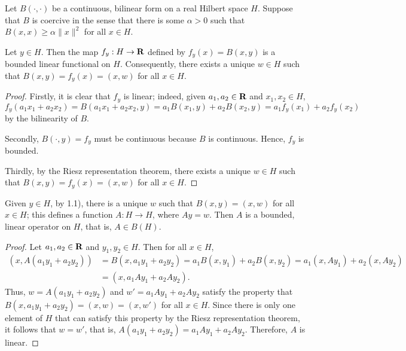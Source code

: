 \documentclass{homework}
\begin{document}
	\maketitle
	
	\question
	Let $B(\cdot,\cdot)$ be a continuous, bilinear form on a real Hilbert space $H$. Suppose that $B$ is coercive in the sense that there is some $\alpha > 0$ such that $B(x,x) \ge \alpha\lVert x\rVert^2$ for all $x \in H$.
	\begin{arabicparts}
		\questionpart 
		Let $y \in H$. Then the map $f_y : H \to \textbf{R}$ defined by $f_y(x) = B(x,y)$ is a bounded linear functional on $H$. Consequently, there exists a unique $w \in H$ such that $B(x,y) = f_y(x) = (x,w)$ for all $x \in H$.
		\begin{proof}
			Firstly, it is clear that $f_y$ is linear; indeed, given $a_1, a_2 \in \textbf{R}$ and $x_1, x_2 \in H$,
			\begin{equation}
				f_y(a_1x_1+a_2x_2) = B(a_1x_1+a_2x_2,y) = a_1B(x_1,y) + a_2B(x_2,y) = a_1f_y(x_1) + a_2f_y(x_2)
			\end{equation}
			by the bilinearity of $B$.
			
			Secondly, $B(\cdot, y)=f_y$ must be continuous because $B$ is continuous. Hence, $f_y$ is bounded.
			
			Thirdly, by the Riesz representation theorem, there exists a unique $w \in H$ such that $B(x,y) = f_y(x) = (x,w)$ for all $x \in H$.
		\end{proof}
		
		\questionpart 
		Given $y \in H$, by 1.1), there is a unique $w$ such that $B(x,y) = (x,w)$ for all $x \in H$; this defines a function $A: H \to H$, where $Ay = w$. Then $A$ is a bounded, linear operator on $H$, that is, $A \in B(H)$.
		\begin{proof}
			Let $a_1, a_2 \in \textbf{R}$ and $y_1, y_2 \in H$. Then for all $x \in H$,
			\begin{equation}
			\begin{aligned}
				(x, A(a_1y_1+a_2y_2)) &= B(x,a_1y_1 + a_2y_2) = a_1B(x,y_1) + a_2B(x,y_2) = a_1(x,Ay_1) + a_2(x,Ay_2) \\
				&= (x, a_1Ay_1 + a_2Ay_2).
			\end{aligned}
			\end{equation}
			Thus, $w=A(a_1y_1+a_2y_2)$ and $w' = a_1Ay_1 + a_2Ay_2$ satisfy the property that $B(x,a_1y_1+a_2y_2) = (x,w) = (x,w')$ for all $x \in H$. Since there is only one element of $H$ that can satisfy this property by the Riesz representation theorem, it follows that $w=w'$, that is, $A(a_1y_1 + a_2y_2) = a_1Ay_1 + a_2Ay_2$. Therefore, $A$ is linear.
			

\end{proof}
\end{arabicparts}
\end{document}
